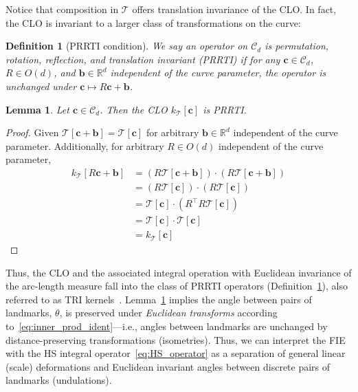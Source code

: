 \documentclass[pdflatex,iicol]{sn-jnl}%
\theoremstyle{thmstyleone}%
\newtheorem{lemma}{Lemma}%
\theoremstyle{thmstyletwo}%
\theoremstyle{thmstylethree}%
\newtheorem{definition}{Definition}%
\begin{document}
Notice that composition in $\mathcal{T}$ offers translation invariance of the CLO. In fact, the CLO is invariant to a larger class of transformations on the curve:

\begin{definition}[PRRTI condition] \label{def:PRRTI}
    We say an operator on $\mathcal{C}_d$ is \emph{permutation, rotation, reflection, and translation invariant} (PRRTI) if for any $\boldsymbol{c}\in\mathcal{C}_d$, $R\in O(d)$, and $\boldsymbol{b}\in\mathbb{R}^d$ independent of the curve parameter, the operator is unchanged under $\boldsymbol{c}\mapsto R\boldsymbol{c}+\boldsymbol{b}$.
\end{definition}

\begin{lemma}\label{lemma:CLO_invariance}
    Let $\boldsymbol{c}\in\mathcal{C}_d$. Then the CLO $k_{\mathcal{T}}[\boldsymbol{c}]$ is PRRTI.
\end{lemma}
\begin{proof}
    Given $\mathcal{T}[\boldsymbol{c} +\boldsymbol{b}] = \mathcal{T}[\boldsymbol{c}]$ for arbitrary $\boldsymbol{b} \in \mathbb{R}^d$ independent of the curve parameter. Additionally, for arbitrary $R \in O(d)$ independent of the curve parameter,
    \begin{align}
        k_{\mathcal{T}}[R\boldsymbol{c} + \boldsymbol{b}] &= \left(R\mathcal{T}[\boldsymbol{c} + \boldsymbol{b}]\right) \cdot \left( R \mathcal{T}[\boldsymbol{c} + \boldsymbol{b}]\right)\\ \nonumber
        &= \left(R\mathcal{T}[\boldsymbol{c}]\right) \cdot \left( R \mathcal{T}[\boldsymbol{c}]\right)\\ \nonumber
        &= \mathcal{T}[\boldsymbol{c}] \cdot \left( R^{\top}R \mathcal{T}[\boldsymbol{c}]\right)\\ \nonumber
        &= \mathcal{T}[\boldsymbol{c}]\cdot \mathcal{T}[\boldsymbol{c}]\\ \nonumber
        &= k_{\mathcal{T}}[\boldsymbol{c}] \nonumber
    \end{align}
\end{proof}
Thus, the CLO and the associated integral operation with Euclidean invariance of the arc-length measure fall into the class of PRRTI operators (Definition~\ref{def:PRRTI}), also referred to as TRI kernels~\cite{micheli2013matrix}. Lemma~\ref{lemma:CLO_invariance} implies the angle between pairs of landmarks, $\theta$, is preserved under \emph{Euclidean transforms} according to~\eqref{eq:inner_prod_ident}---i.e., angles between landmarks are unchanged by distance-preserving transformations (isometries). Thus, we can interpret the FIE with the HS integral operator~\eqref{eq:HS_operator} as a separation of general linear (scale) deformations and Euclidean invariant angles between discrete pairs of landmarks (undulations). 
\end{document}
